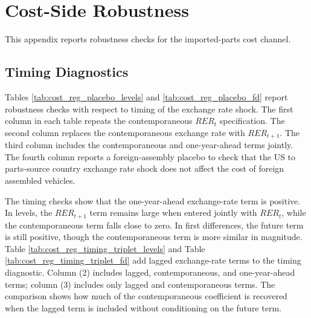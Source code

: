 \documentclass[11pt]{article}
\begin{document}


\clearpage
\setcounter{table}{0}
\renewcommand{\thetable}{C\arabic{table}}
\section{Cost-Side Robustness}\label{sec:appendix_cost_side_robustness}

This appendix reports robustness checks for the imported-parts cost channel.

\subsection{Timing Diagnostics}

Tables \ref{tab:cost_reg_placebo_levels} and \ref{tab:cost_reg_placebo_fd} report robustness checks with respect to timing of the exchange rate shock. The first column in each table repeats the contemporaneous \(RER_t\) specification. The second column replaces the contemporaneous exchange rate with \(RER_{t+1}\). The third column includes the contemporaneous and one-year-ahead terms jointly. The fourth column reports a foreign-assembly placebo to check that the US to parts-source country exchange rate shock does not affect the cost of foreign assembled vehicles.

The timing checks show that the one-year-ahead exchange-rate term is positive. In levels, the \(RER_{t+1}\) term remains large when entered jointly with \(RER_t\), while the contemporaneous term falls close to zero. In first differences, the future term is still positive, though the contemporaneous term is more similar in magnitude. Table \ref{tab:cost_reg_timing_triplet_levels} and Table \ref{tab:cost_reg_timing_triplet_fd} add lagged exchange-rate terms to the timing diagnostic. Column (2) includes lagged, contemporaneous, and one-year-ahead terms; column (3) includes only lagged and contemporaneous terms. The comparison shows how much of the contemporaneous coefficient is recovered when the lagged term is included without conditioning on the future term.



\clearpage



\clearpage


\end{document}
